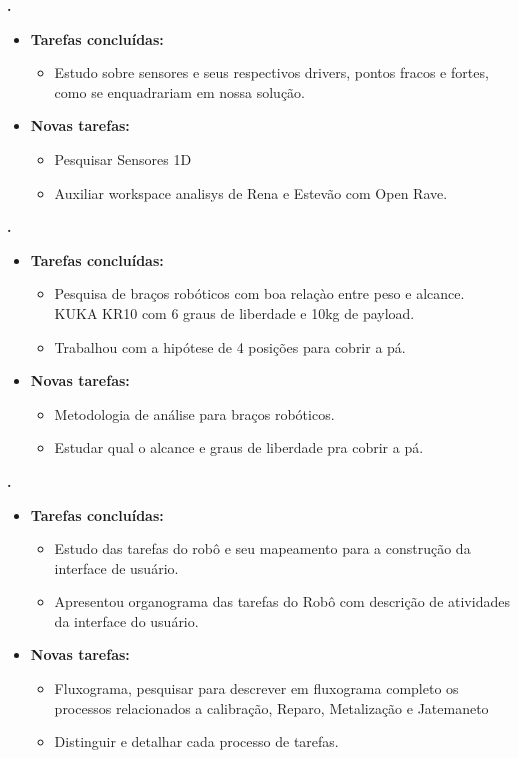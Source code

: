 			
   \textbf{\gabriel.} 
	\begin{itemize}
		\item \textbf{Tarefas concluídas:}
			\begin{itemize}    
				\item Estudo sobre sensores e seus respectivos drivers, pontos fracos e
				fortes, como se enquadrariam em nossa solução.  
			\end{itemize}
		
		\item \textbf{Novas tarefas:}
			\begin{itemize} 
			    \item Pesquisar Sensores 1D
			    \item Auxiliar workspace analisys de Rena e Estevão com Open Rave. 
			\end{itemize}
	\end{itemize}

			
\textbf{.} 
	\begin{itemize}
		\item \textbf{Tarefas concluídas:}
			\begin{itemize}    
				\item Pesquisa de braços robóticos com boa relaçào entre peso e alcance.
				KUKA KR10 com 6 graus de liberdade e 10kg de payload.
				\item Trabalhou com a hipótese de 4 posições para cobrir a pá.
			\end{itemize}
		
		\item \textbf{Novas tarefas:}
			\begin{itemize} 
				\item Metodologia de análise para braços robóticos.
				\item Estudar qual o alcance e graus de liberdade pra cobrir a pá.
			\end{itemize}
	\end{itemize}
	
		
   \textbf{\julia.} 
	\begin{itemize}
		\item \textbf{Tarefas concluídas:}
			\begin{itemize}    
				\item Estudo das tarefas do robô e seu mapeamento para a construção da
			    interface de usuário.
			    \item Apresentou organograma das tarefas do Robô com descrição de
				atividades da interface do usuário.
			\end{itemize}
		
		\item \textbf{Novas tarefas:}
			\begin{itemize} 
			 \item Fluxograma, pesquisar para descrever em fluxograma completo os
			 processos relacionados a calibração, Reparo, Metalização e Jatemaneto
			 \item Distinguir e detalhar cada processo de tarefas. 
			\end{itemize}
	\end{itemize}


